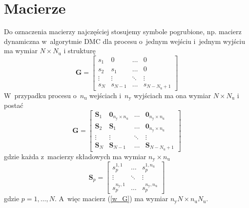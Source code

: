 \section{Macierze}
Do oznaczenia macierzy najczęściej stosujemy symbole pogrubione, np. macierz dynamiczna w~algorytmie DMC dla procesu o~jednym wejściu i~jednym wyjściu ma wymiar $N \times N_{\mathrm{u}}$ i strukturę
\begin{equation}
\boldsymbol{G}=\left[
\begin{array}
{cccc}
s_{1} & 0 & \ldots & 0\\
s_{2} & s_{1} & \ldots & 0\\
\vdots & \vdots & \ddots & \vdots\\
s_{N} & s_{N-1} & \ldots &  s_{N-N_{\mathrm{u}}+1}
\end{array}
\right]
\end{equation}
W~przypadku procesu o~$n_{\mathrm{u}}$ wejściach i~$n_{\mathrm{y}}$ wyjściach ma ona  wymiar $N\times N_{\mathrm{u}}$ i postać
\begin{equation}
\boldsymbol{G}=\left[
\begin{array}
{cccc}
\boldsymbol{S}_{1} & \boldsymbol{0}_{n_{\mathrm{y}}\times n_{\mathrm{u}}} & \ldots & \boldsymbol{0}_{n_{\mathrm{y}}\times n_{\mathrm{u}}}\\
\boldsymbol{S}_{2} & \boldsymbol{S}_{1} & \ldots & \boldsymbol{0}_{n_{\mathrm{y}}\times n_{\mathrm{u}}}\\
\vdots & \vdots & \ddots & \vdots\\
\boldsymbol{S}_{N} & \boldsymbol{S}_{N-1} & \ldots &  \boldsymbol{S}_{N-N_{\mathrm{u}}+1}%
\end{array}
\right]
\label{w_G}
\end{equation}
gdzie każda z~macierzy składowych ma wymiar $n_{\mathrm{y}}\times n_{\mathrm{u}}$
\begin{equation}
\boldsymbol{S}_p=\left[
\begin{array}
{ccc}
s_p^{1,1} & \ldots & s_p^{1,n_{\mathrm{u}}}\\
\vdots & \ddots & \vdots\\
s_p^{n_{\mathrm{y}},1} & \ldots & s_p^{n_{\mathrm{y}},n_{\mathrm{u}}}
\end{array}
\right]
\end{equation}
gdzie $p=1,\ldots,N$. A~więc macierz (\ref{w_G}) ma wymiar $n_{\mathrm{y}}N\times n_{\mathrm{u}}N_{\mathrm{u}}$.

